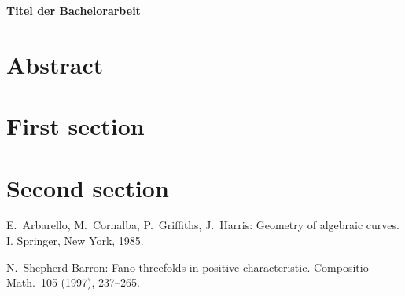 \documentclass[12pt,a4paper]{article}
\begin{document}
\begin{titlepage}
\begin{center}

\textbf{\LARGE Titel der Bachelorarbeit}

\end{center}
\end{titlepage}
\tableofcontents
\pagebreak
\section*{Abstract}
\pagebreak
\section{First section}
\section{Second section}
\pagebreak
\begin{thebibliography}{ccccc}

E.\ Arbarello, M.\ Cornalba, P.\ Griffiths, J.\ Harris:
Geometry of algebraic curves. I.
Springer, New York, 1985.

N.\ Shepherd-Barron:
Fano threefolds in positive characteristic.
Compositio Math.\  105  (1997),  237--265.
\end{thebibliography}
\end{document}
